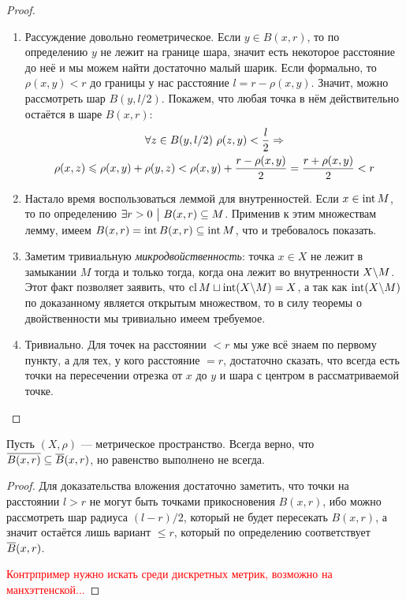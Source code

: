 \begin{proof}~
	\begin{enumerate}
		\item Рассуждение довольно геометрическое. Если $y \in B(x, r)$, то по определению $y$ не лежит на границе шара, значит есть некоторое расстояние до неё и мы можем найти достаточно малый шарик. Если формально, то $\rho(x, y) < r$ до границы у нас расстояние $l = r - \rho(x, y)$. Значит, можно рассмотреть шар $B(y, l / 2)$. Покажем, что любая точка в нём действительно остаётся в шаре $B(x, r)$:
		\begin{multline*}
			\forall z \in B(y, l / 2)\ \rho(z, y) < \frac{l}{2} \Rightarrow
			\\
			\rho(x, z) \leqslant \rho(x, y) + \rho(y, z) < \rho(x, y) + \frac{r - \rho(x, y)}{2} = \frac{r + \rho(x, y)}{2} < r
		\end{multline*}
		
		\item Настало время воспользоваться леммой для внутренностей. Если $x \in \operatorname{int} M$, то по определению $\exists r > 0 \ \big|\  B(x, r) \subseteq M$. Применив к этим множествам лемму, имеем $B(x, r) = \operatorname{int} B(x, r) \subseteq \operatorname{int} M$, что и требовалось показать.
		
		\item Заметим тривиальную \textit{микродвойственность}: точка $x \in X$ не лежит в замыкании $M$ тогда и только тогда, когда она лежит во внутренности $X \backslash M$. Этот факт позволяет заявить, что $\operatorname{cl} M \sqcup \operatorname{int} (X \backslash M) = X$, а так как $\operatorname{int} (X \backslash M)$ по доказанному является открытым множеством, то в силу теоремы о двойственности мы тривиально имеем требуемое.
		
		\item Тривиально. Для точек на расстоянии $< r$ мы уже всё знаем по первому пункту, а для тех, у кого расстояние $= r$, достаточно сказать, что всегда есть точки на пересечении отрезка от $x$ до $y$ и шара с центром в рассматриваемой точке.
	\end{enumerate}
\end{proof}

\begin{proposition}
	Пусть $(X, \rho)$ --- метрическое пространство. Всегда верно, что \\ $\overline{B(x, r)} \subseteq \overline{B}(x, r)$, но равенство выполнено не всегда.
\end{proposition}

\begin{proof}
	Для доказательства вложения достаточно заметить, что точки на расстоянии $l > r$ не могут быть точками прикосновения $B(x, r)$, ибо можно рассмотреть шар радиуса $(l - r) / 2$, который не будет пересекать $B(x, r)$, а значит остаётся лишь вариант $\le r$, который по определению соответствует $\overline{B}(x, r)$.
	
	\textcolor{red}{Контрпример нужно искать среди дискретных метрик, возможно на манхэттенской...}
\end{proof}


